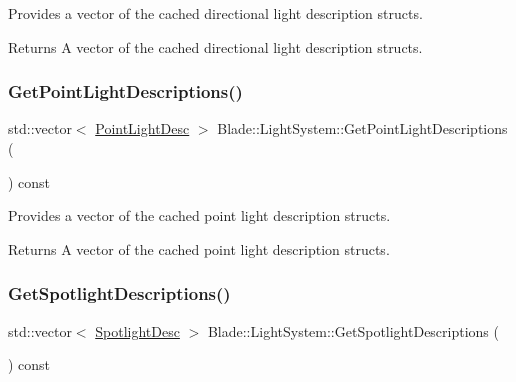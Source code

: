 Provides a vector of the cached directional light description structs. 

\begin{DoxyReturn}{Returns}
A vector of the cached directional light description structs. 
\end{DoxyReturn}
\mbox{\label{class_blade_1_1_light_system_ad42bb7397b56bd224d53425f79c0a63b}} 
\subsubsection{\texorpdfstring{Get\+Point\+Light\+Descriptions()}{GetPointLightDescriptions()}}
{\footnotesize\ttfamily std\+::vector$<$ \hyperlink{struct_blade_1_1_point_light_desc}{Point\+Light\+Desc} $>$ Blade\+::\+Light\+System\+::\+Get\+Point\+Light\+Descriptions (\begin{DoxyParamCaption}{ }\end{DoxyParamCaption}) const\hspace{0.3cm}{\ttfamily [noexcept]}}



Provides a vector of the cached point light description structs. 

\begin{DoxyReturn}{Returns}
A vector of the cached point light description structs. 
\end{DoxyReturn}
\mbox{\label{class_blade_1_1_light_system_ace130c5e66ef2459a8dba36ea448124c}} 
\subsubsection{\texorpdfstring{Get\+Spotlight\+Descriptions()}{GetSpotlightDescriptions()}}
{\footnotesize\ttfamily std\+::vector$<$ \hyperlink{struct_blade_1_1_spotlight_desc}{Spotlight\+Desc} $>$ Blade\+::\+Light\+System\+::\+Get\+Spotlight\+Descriptions (\begin{DoxyParamCaption}{ }\end{DoxyParamCaption}) const\hspace{0.3cm}{\ttfamily [noexcept]}}



